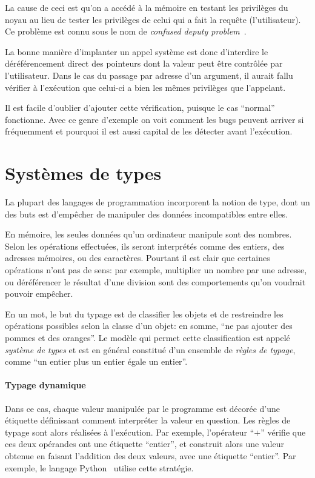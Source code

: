La cause de ceci est qu'on a accédé à la mémoire en testant les privilèges du
noyau au lieu de tester les privilèges de celui qui a fait la requête
(l'utilisateur). Ce problème est connu sous le nom de \emph{confused deputy
problem}~\cite{hardy88confused}.

La bonne manière d'implanter un appel système est donc d'interdire le
déréférencement direct des pointeurs dont la valeur peut être contrôlée par
l'utilisateur. Dans le cas du passage par adresse d'un argument, il aurait fallu
vérifier à l'exécution que celui-ci a bien les mêmes privilèges que l'appelant.

Il est facile d'oublier d'ajouter cette vérification, puisque le cas ``normal''
fonctionne. Avec ce genre d'exemple on voit comment les bugs peuvent arriver si
fréquemment et pourquoi il est aussi capital de les détecter avant l'exécution.

\section{Systèmes de types}
\label{sec:types-intro}

La plupart des langages de programmation incorporent la notion de type, dont un
des buts est d'empêcher de manipuler des données incompatibles entre elles.

En mémoire, les seules données qu'un ordinateur manipule sont des nombres. Selon
les opérations effectuées, ils seront interprétés comme des entiers, des
adresses mémoires, ou des caractères. Pourtant il est clair que certaines
opérations n'ont pas de sens: par exemple, multiplier un nombre par une adresse,
ou déréférencer le résultat d'une division sont des comportements qu'on voudrait
pouvoir empêcher.

En un mot, le but du typage est de classifier les objets et de restreindre les
opérations possibles selon la classe d'un objet: en somme, ``ne pas ajouter des
pommes et des oranges''. Le modèle qui permet cette classification est appelé
\emph{système de types} et est en général constitué d'un ensemble de
\emph{règles de typage}, comme ``un entier plus un entier égale un entier''.

\paragraph{Typage dynamique}

Dans ce cas, chaque valeur manipulée par le programme est décorée d'une
étiquette définissant comment interpréter la valeur en question. Les règles de
typage sont alors réalisées à l'exécution. Par exemple, l'opérateur ``$+$''
vérifie que ces deux opérandes ont une étiquette ``entier'', et construit alors
une valeur obtenue en faisant l'addition des deux valeurs, avec une étiquette
``entier''. Par exemple, le langage Python~ utilise cette
stratégie.

